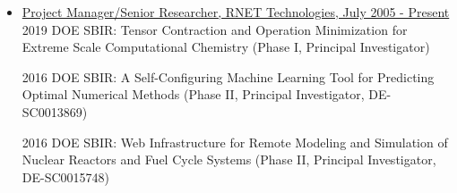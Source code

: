  \begin{itemize}
 	\item\underline{Project Manager/Senior Researcher, RNET Technologies, July 2005 - Present}\\
	
	2019 DOE SBIR: Tensor Contraction and Operation Minimization for Extreme Scale Computational Chemistry (Phase I,
 	Principal Investigator)
	
 	2016 DOE SBIR: A Self-Configuring Machine Learning
 	Tool for Predicting Optimal Numerical Methods (Phase II,
 	Principal Investigator, DE-SC0013869)

 	2016 DOE SBIR: Web Infrastructure for Remote Modeling
 	and Simulation of Nuclear Reactors and Fuel Cycle Systems
 	(Phase II, Principal Investigator, DE-SC0015748)

 	

\end{itemize}
